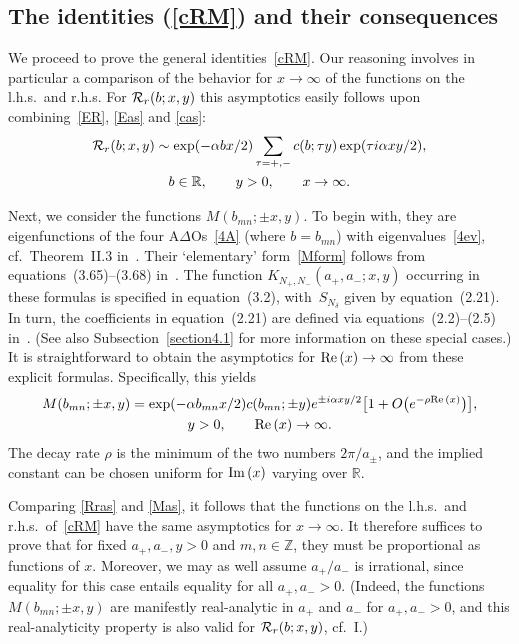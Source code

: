 \documentclass[11pt]{article}
\numberwithin{equation}{section}
\newcommand{\De}{\Delta}
\newcommand{\de}{\delta}
\newcommand{\Z}{{\mathbb Z}}
\newcommand{\R}{{\mathbb R}}
\newcommand{\re}{{\rm Re}\, }
\newcommand{\im}{{\rm Im}\, }
\newcommand{\cR}{{\cal R}}
\newcommand{\aaa}{a_{+},a_{-}}
\begin{document}
\subsection{The identities (\ref{cRM}) and their consequences}\label{section2.3}

We proceed to prove the general identities~\eqref{cRM}.
Our reasoning involves in particular a comparison of the behavior for $x\to\infty$ of the functions on the l.h.s.\ and r.h.s. For $\cR_r(b;x,y)$ this asymptotics easily follows upon combining~\eqref{ER}, \eqref{Eas} and \eqref{cas}:
\begin{gather}\label{Rras}
\cR_r(b;x,y)\sim \exp(-\alpha bx/2)\sum_{\tau=+,-}c(b;\tau y)\exp(\tau i\alpha xy/2),\\
 b\in\R,\qquad y>0,\qquad x\to\infty.\nonumber
\end{gather}

{\sloppy Next, we consider the functions $M(b_{mn};\pm x,y)$. To begin with, they are eigenfunctions of the four A$\De$Os~\eqref{4A} (where $b=b_{mn}$) with eigenvalues~\eqref{4ev}, cf.~Theorem~II.3 in~\cite{GLFII}. Their `ele\-men\-ta\-ry' form~\eqref{Mform} follows from equations~(3.65)--(3.68) in~\cite{GLFII}. The function $K_{N_{+},N_{-}}(\aaa;x,y)$ occurring in these formulas is specif\/ied in equation~(3.2), with~$S_{N_{\de}}$ given by equation~(2.21). In turn, the coef\/f\/icients in equation~(2.21) are def\/ined via equations~(2.2)--(2.5) in~\cite{GLFII}. (See also Subsection~\ref{section4.1} for more information on these special cases.) It is straightforward to obtain the asymptotics for $\re(x)\to \infty$ from these explicit formulas. Specif\/ically, this yields
\begin{gather}\label{Mas}
M(b_{mn};\pm x,y)=\exp (- \alpha b_{mn}x/2)c(b_{mn};\pm y)e^{ \pm i\alpha xy/2}\big[1+O\big(e^{-\rho \re(x)}\big)\big],\\
 y>0,\qquad \re(x)\to \infty.\nonumber
\end{gather}
The decay rate $\rho$ is the minimum of the two numbers $2\pi /a_{\pm}$, and the implied constant can be chosen uniform for $\im (x)$ varying over $\R$.

}

Comparing \eqref{Rras} and \eqref{Mas}, it follows that the functions on the l.h.s.\ and r.h.s.\ of~\eqref{cRM} have the same asymptotics for $x\to \infty$. It therefore suf\/f\/ices to prove that for f\/ixed $\aaa,y>0$ and $m,n\in\Z$, they must be proportional as functions of $x$. Moreover, we may as well assume $a_{+}/a_{-}$ is irrational, since equality for this case entails equality for all $\aaa>0$. (Indeed, the functions $M(b_{mn};\pm x,y)$ are manifestly real-analytic in $a_{+}$ and $a_{-}$ for $\aaa >0$, and this real-analyticity property is also valid for $\cR_r(b;x,y)$, cf.~I.)
\end{document}
